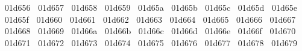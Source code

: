 {  ^^^^^^01d656%
  ^^^^^^01d657%
  ^^^^^^01d658%
  ^^^^^^01d659%
  ^^^^^^01d65a%
  ^^^^^^01d65b%
  ^^^^^^01d65c%
  ^^^^^^01d65d%
  ^^^^^^01d65e%
  ^^^^^^01d65f%
  ^^^^^^01d660%
  ^^^^^^01d661%
  ^^^^^^01d662%
  ^^^^^^01d663%
  ^^^^^^01d664%
  ^^^^^^01d665%
  ^^^^^^01d666%
  ^^^^^^01d667%
  ^^^^^^01d668%
  ^^^^^^01d669%
  ^^^^^^01d66a%
  ^^^^^^01d66b%
  ^^^^^^01d66c%
  ^^^^^^01d66d%
  ^^^^^^01d66e%
  ^^^^^^01d66f%
  ^^^^^^01d670%
  ^^^^^^01d671%
  ^^^^^^01d672%
  ^^^^^^01d673%
  ^^^^^^01d674%
  ^^^^^^01d675%
  ^^^^^^01d676%
  ^^^^^^01d677%
  ^^^^^^01d678%
  ^^^^^^01d679%
}
